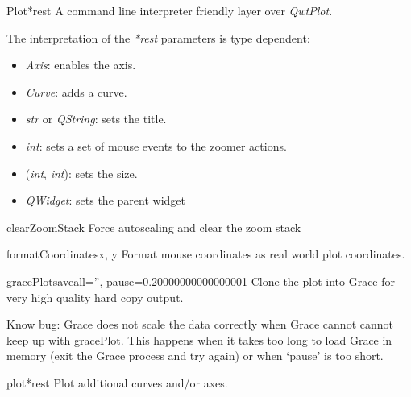 \documentclass[a4paper,10pt,english]{manual}
\begin{document}
\hypertarget{PyQt4.Qwt5.qplt.Plot}{}\begin{classdesc}{Plot}{*rest}
A command line interpreter friendly layer over \emph{QwtPlot}.

The interpretation of the \emph{*rest} parameters is type dependent:
\begin{itemize}
\item {} 
\emph{Axis}: enables the axis.

\item {} 
\emph{Curve}: adds a curve.

\item {} 
\emph{str} or \emph{QString}: sets the title.

\item {} 
\emph{int}: sets a set of mouse events to the zoomer actions.

\item {} 
(\emph{int}, \emph{int}): sets the size.

\item {} 
\emph{QWidget}: sets the parent widget

\end{itemize}

\hypertarget{PyQt4.Qwt5.qplt.Plot.clearZoomStack}{}\begin{methoddesc}{clearZoomStack}{}
Force autoscaling and clear the zoom stack
\end{methoddesc}

\hypertarget{PyQt4.Qwt5.qplt.Plot.formatCoordinates}{}\begin{methoddesc}{formatCoordinates}{x, y}
Format mouse coordinates as real world plot coordinates.
\end{methoddesc}

\hypertarget{PyQt4.Qwt5.qplt.Plot.gracePlot}{}\begin{methoddesc}{gracePlot}{saveall='', pause=0.20000000000000001}
Clone the plot into Grace for very high quality hard copy output.

Know bug: Grace does not scale the data correctly when Grace cannot
cannot keep up with gracePlot.  This happens when it takes too long
to load Grace in memory (exit the Grace process and try again) or
when `pause' is too short.
\end{methoddesc}

\hypertarget{PyQt4.Qwt5.qplt.Plot.plot}{}\begin{methoddesc}{plot}{*rest}
Plot additional curves and/or axes.


\end{methoddesc}
\end{classdesc}
\end{document}
